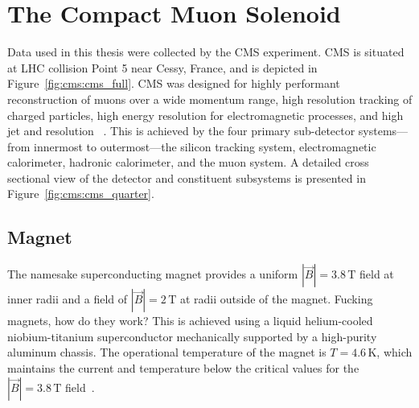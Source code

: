 \section{The Compact Muon Solenoid}\label{ch:cms:CMS}

Data used in this thesis were collected by the CMS experiment. CMS is situated at LHC collision Point 5 near Cessy, France, and is depicted in Figure~\ref{fig:cms:cms_full}. CMS was designed for highly performant reconstruction of muons over a wide momentum range, high resolution tracking of charged particles, high energy resolution for electromagnetic processes, and high jet and \met resolution ~\cite{Ball:2007zza,Bayatian:2006nff}. This is achieved by the four primary sub-detector systems---from innermost to outermost---the silicon tracking system, electromagnetic calorimeter, hadronic calorimeter, and the muon system. A detailed cross sectional view of the detector and constituent subsystems is presented in Figure~\ref{fig:cms:cms_quarter}.






\subsection{Magnet}\label{ch:cms:magnet}
The namesake superconducting magnet provides a uniform $|\vec{B}| = 3.8 \,\mathrm{T}$ field at inner radii and a field of $|\vec{B}| = 2 \,\mathrm{T}$ at radii outside of the magnet. Fucking magnets, how do they work? This is achieved using a liquid helium-cooled niobium-titanium superconductor mechanically supported by a high-purity aluminum chassis. The operational temperature of the magnet is $T = 4.6 \,\mathrm{K}$, which maintains the current and temperature below the critical values for the $|\vec{B}| = 3.8 \,\mathrm{T}$ field~\cite{Acquistapace:1997fm}.

